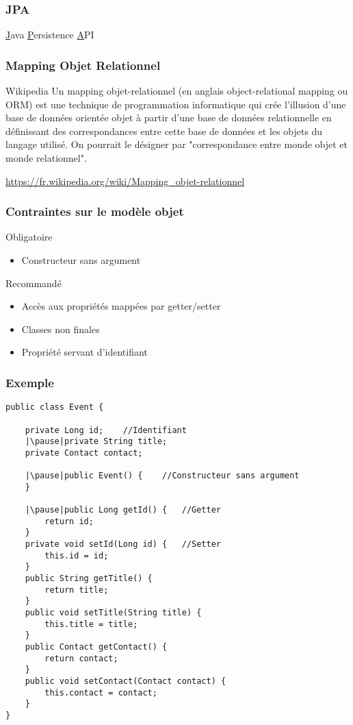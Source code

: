 \documentclass[t,12pt]{beamer}
\begin{document}
\begin{frame}
	\frametitle{JPA}

	\underline{J}ava \underline{P}ersistence \underline{A}PI
\end{frame}

\begin{frame}
	\frametitle{Mapping Objet Relationnel}

	\begin{block}{Wikipedia}
		Un mapping objet-relationnel (en anglais object-relational mapping ou ORM) est une technique de programmation informatique qui cr\'ee l'illusion d'une base de donn\'ees orient\'ee objet \`a partir d'une base de donn\'ees relationnelle en d\'efinissant des correspondances entre cette base de donn\'ees et les objets du langage utilis\'e. On pourrait le d\'esigner par "correspondance entre monde objet et monde relationnel".
	\end{block}
	\url{https://fr.wikipedia.org/wiki/Mapping_objet-relationnel}

\end{frame}

\begin{frame}
	\frametitle{Contraintes sur le mod\`ele objet}

	\begin{alertblock}{Obligatoire}
		\begin{itemize}
			\item Constructeur sans argument
		\end{itemize}
	\end{alertblock}

	\begin{block}{Recommand\'e}
		\begin{itemize}
			\item Acc\`es aux propri\'et\'es mapp\'ees par getter/setter
			\item Classes non finales
			\item Propri\'et\'e servant d'identifiant
		\end{itemize}
	\end{block}
\end{frame}

\begin{frame}[fragile]
	\frametitle{Exemple}

	\begin{lstlisting}[frame=single, basicstyle=\tiny]
public class Event {

    private Long id;	//Identifiant
    |\pause|private String title;
    private Contact contact;

    |\pause|public Event() {	//Constructeur sans argument
    }

    |\pause|public Long getId() {	//Getter
        return id;
    }
    private void setId(Long id) {	//Setter
        this.id = id;
    }
    public String getTitle() {
        return title;
    }
    public void setTitle(String title) {
        this.title = title;
    }
    public Contact getContact() {
        return contact;
    }
    public void setContact(Contact contact) {
        this.contact = contact;
    }
}
	\end{lstlisting}
\end{frame}
\end{document}
